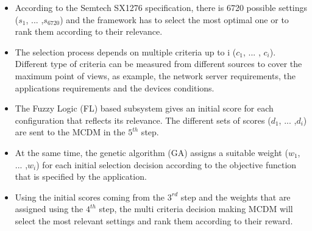 \begin{itemize}
	\item According to the Semtech SX1276 specification, there is 6720 possible settings ($s_{1}$, ... ,$s_{6720}$) and the framework has to select the most optimal one or to rank them according to their relevance.
	\item The selection process depends on multiple criteria up to i ($c_{1}$, ... , $c_{i}$).
		Different type of criteria can be measured from different sources to cover the maximum point of views,
		as example,
		the network server requirements, the applications requirements and the devices conditions.
	\item The Fuzzy Logic (FL) based subsystem gives an initial score for each configuration that reflects its relevance.
		The different sets of scores ($d_{1}$, ... ,$d_{i}$) are sent to the \ac{MCDM} in the $5^{th}$ step.
	\item At the same time,
			the genetic algorithm (GA) \cite{alkhawlani_access_2008} assigns a suitable weight ($w_{1}$, ... ,$w_{i}$) for each initial selection decision according to the objective function that is specified by the application.
	\item Using the initial scores coming from the $3^{rd}$ step and the weights that are assigned using the $4^{th}$ step,
			the multi criteria decision making{} \ac{MCDM} will select the most relevant settings and rank them according to their reward.
\end{itemize}
